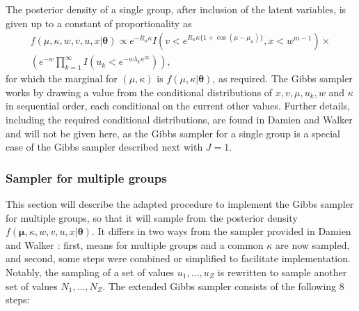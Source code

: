 \documentclass[]{gSCS2e}
\theoremstyle{plain}
\theoremstyle{definition}
\theoremstyle{remark}
\begin{document}
The posterior density of a single group, after inclusion of the latent variables, is given up to a constant of proportionality as
\begin{multline*}
 f (\mu, \kappa, w, v, u, x \vert \boldsymbol\theta)  \propto e^{-R_n \kappa} I(v < e^{R_{n} \kappa \{1+\cos(\mu - \mu_n)\}}, x < w^{m-1}) \times \\ 
 \left( e^{-w} \prod_{k=1}^{\infty} I(u_k < e^{-w\lambda_k\kappa^{2k}}) \right),
 \end{multline*}
for which the marginal for $(\mu, \kappa)$ is $f(\mu, \kappa \vert \boldsymbol\theta)$, as required. The Gibbs sampler works by drawing a value from the conditional distributions of $x, v, \mu, u_k, w$ and $\kappa$ in sequential order, each conditional on the current other values. Further details, including the required conditional distributions, are found in Damien and Walker \cite{damien1999fullbayes} and will not be given here, as the Gibbs sampler for a single group is a special case of the Gibbs sampler described next with $J=1$. 

\subsubsection{Sampler for multiple groups \label{gibbsmulti}}

This section will describe the adapted procedure to implement the Gibbs sampler for multiple groups, so that it will sample from the posterior density $f(\boldsymbol\mu, \kappa, w, v, u, x \vert \boldsymbol\theta)$. It differs in two ways from the sampler provided in Damien and Walker \cite{damien1999fullbayes}: first, means for multiple groups and a common $\kappa$ are now sampled, and second, some steps were combined or simplified to facilitate implementation. Notably, the sampling of a set of values $u_1, \dots, u_Z$ is rewritten to sample another set of values $N_1, \dots, N_Z$. The extended Gibbs sampler consists of the following 8 steps:
\end{document}
